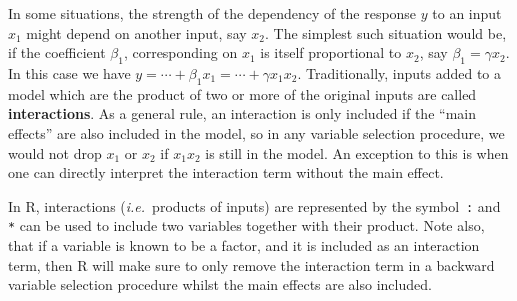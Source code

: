 \documentclass[
  a4paper,
]{article}
\theoremstyle{definition}
\theoremstyle{definition}
\theoremstyle{definition}
\theoremstyle{definition}
\theoremstyle{remark}
\begin{document}
In some situations, the strength of the dependency of the response \(y\) to an
input \(x_1\) might depend on another input, say \(x_2\). The simplest such
situation would be, if the coefficient \(\beta_1\), corresponding on \(x_1\) is
itself proportional to \(x_2\), say \(\beta_1 = \gamma x_2\). In this case we have
\(y = \cdots + \beta_1 x_1 = \cdots + \gamma x_1 x_2\). Traditionally, inputs
added to a model which are the product of two or more of the original inputs
are called \textbf{interactions}. As a general rule, an interaction is only included
if the ``main effects'' are also included in the model, so in any variable
selection procedure, we would not drop \(x_1\) or \(x_2\) if \(x_1 x_2\) is still in
the model. An exception to this is when one can directly interpret the
interaction term without the main effect.

In R, interactions (\emph{i.e.}~products of inputs) are represented by the
symbol~\texttt{:} and \texttt{*} can be used to include two variables together with their
product. Note also, that if a variable is known to be a factor, and it is
included as an interaction term, then R will make sure to only remove the
interaction term in a backward variable selection procedure whilst the main
effects are also included.
\end{document}
